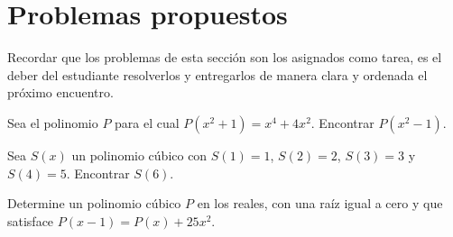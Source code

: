 \section{Problemas propuestos}
{
    Recordar que los problemas de esta sección son los asignados como tarea, es el deber del estudiante resolverlos y entregarlos
    de manera clara y ordenada el próximo encuentro.

    \begin{section-problem}
        Sea el polinomio $P$ para el cual $P(x^2 + 1) = x^4 + 4x^2$. Encontrar $P(x^2 - 1).$
    \end{section-problem}

    \begin{section-problem}
        Sea $S(x)$ un polinomio cúbico con $S(1) = 1$, $S(2) = 2$, $S(3) = 3$ y $S(4) = 5$. Encontrar $S(6)$.
    \end{section-problem}

    \begin{section-problem}
        Determine un polinomio cúbico $P$ en los reales, con una raíz igual a cero y que satisface $P(x - 1) = P(x) + 25x^2$.
    \end{section-problem}

}\label{sec:problemas-propuestos}
